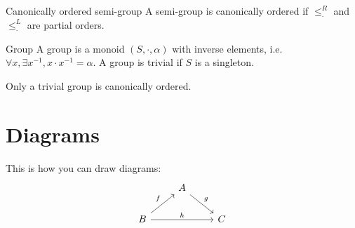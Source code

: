 \begin{definition}{Canonically ordered semi-group}
  A semi-group is canonically ordered if $\leq^R_\cdot$ and $\leq^L_\cdot$ are partial orders.
\end{definition}

\begin{definition}{Group}
  A group is a monoid $(S, \cdot, \alpha)$ with inverse elements, i.e. $\forall x, \exists x^{-1}, x \cdot x^{-1} = \alpha$.
  A group is trivial if $S$ is a singleton.
\end{definition}

\begin{exercise}
  Only a trivial group is canonically ordered.
\end{exercise}

\section{Diagrams}

\begin{hint}
  This is how you can draw diagrams:
  \[
    \begin{tikzcd}
                                    & A \arrow{dr}{g}    & \\
      B \arrow{ur}{f} \arrow{rr}{h} &                    & C
    \end{tikzcd}
  \]
\end{hint}



